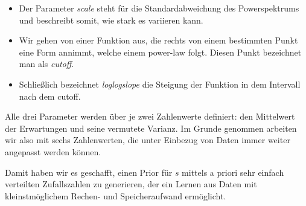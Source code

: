 \begin{itemize}
    \item Der Parameter \emph{scale} steht für die Standardabweichung des Powerspektrums und beschreibt somit, wie stark es variieren kann.
    \item Wir gehen von einer Funktion aus, die rechts von einem bestimmten Punkt eine Form annimmt, welche einem power-law folgt. Diesen Punkt bezeichnet man als \emph{cutoff}.
    \item Schließlich bezeichnet \emph{loglogslope} die Steigung der Funktion in dem Intervall nach dem cutoff.
\end{itemize}
Alle drei Parameter werden über je zwei Zahlenwerte definiert: den Mittelwert der Erwartungen und seine vermutete Varianz. Im Grunde genommen arbeiten wir also mit sechs Zahlenwerten, die unter Einbezug von Daten immer weiter angepasst werden können.

Damit haben wir es geschafft, einen Prior für $s$ mittels a priori sehr einfach verteilten Zufallszahlen zu generieren, der ein Lernen aus Daten mit kleinstmöglichem Rechen- und Speicheraufwand ermöglicht.
